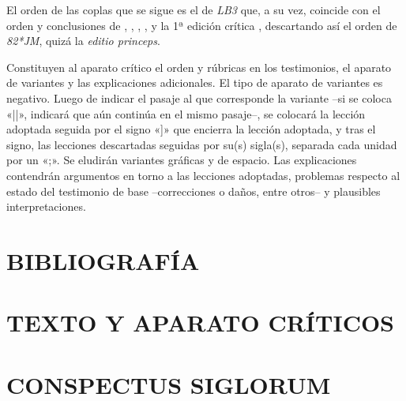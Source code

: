 \documentclass[11pt,a4paper,twoside]{article}
\newcommand{\comillas}[1]{«#1»}
\begin{document}
%
El orden de las coplas que se sigue es el de \textit{LB3} que, a su vez, coincide con el orden y conclusiones de \textcite{Senabre1983}, \textcite{Palumbo1983}, \textcite{Orduna1967}, \textcite{Beltrán1991,Beltrán2013}, \textcite{PérezPriego1990,PérezPriego2017} y la 1ª edición crítica \parencite{Foulché-Delbosc1902}, descartando así el orden de \textit{82*JM}, quizá la \textit{editio princeps}.\par
%
Constituyen al aparato crítico el orden y rúbricas en los testimonios, el aparato de variantes y las explicaciones adicionales. El tipo de aparato de variantes es negativo. Luego de indicar el pasaje al que corresponde la variante --si se coloca \comillas{||}, indicará que aún continúa en el mismo pasaje--, se colocará la lección adoptada seguida por el signo \comillas{]} que encierra la lección adoptada, y tras el signo, las lecciones descartadas seguidas por su(s) sigla(s), separada cada unidad por un \comillas{;}. Se eludirán variantes gráficas y de espacio. Las explicaciones contendrán argumentos en torno a las lecciones adoptadas, problemas respecto al estado del testimonio de base --correcciones o daños, entre otros-- y plausibles interpretaciones.\par

\section*{\fontsize{11}{14}\selectfont BIBLIOGRAFÍA}
\nocite{*}
\printbibliography[heading=none]
\newpage

\section*{\raggedleft\fontsize{13}{14}\selectfont TEXTO Y APARATO CRÍTICOS}
\newpage

\section*{\fontsize{11}{14.35}\selectfont CONSPECTUS SIGLORUM}
\end{document}
